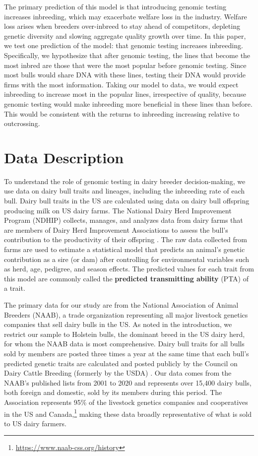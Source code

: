 \documentclass[12pt,letterpaper]{article}
\begin{document}
The primary prediction of this model is that introducing genomic testing increases inbreeding, which may exacerbate welfare loss in the industry. Welfare loss arises when breeders over-inbreed to stay ahead of competitors, depleting genetic diversity and slowing aggregate quality growth over time. In this paper, we test one prediction of the model: that genomic testing increases inbreeding. Specifically, we hypothesize that after genomic testing, the lines that become the most inbred are those that were the most popular before genomic testing. Since most bulls would share DNA with these lines, testing their DNA would provide firms with the most information. Taking our model to data, we would expect inbreeding to increase most in the popular lines, irrespective of quality, because genomic testing would make inbreeding more beneficial in these lines than before.
This would be consistent with the returns to inbreeding increasing relative to outcrossing.

\section{Data Description\label{sec:data_description}}
To understand the role of genomic testing in dairy breeder decision-making, we use data on dairy bull traits and lineages, including the inbreeding rate of each bull. Dairy bull traits in the US are calculated using data on dairy bull offspring producing milk on US dairy farms. The National Dairy Herd Improvement Program (NDHIP) collects, manages, and analyzes data from dairy farms that are members of Dairy Herd Improvement Associations to assess the bull's contribution to the productivity of their offspring \citep{Hutchins_Hueth2023}. The raw data collected from farms are used to estimate a statistical model that predicts an animal's genetic contribution as a sire (or dam) after controlling for environmental variables such as herd, age, pedigree, and season effects. The predicted values for each trait from this model are commonly called the \textbf{predicted transmitting ability} (PTA) of a trait.

The primary data for our study are from the National Association of Animal Breeders (NAAB), a trade organization representing all major livestock genetics companies that sell dairy bulls in the US. As noted in the introduction, we restrict our sample to Holstein bulls, the dominant breed in the US dairy herd, for whom the NAAB data is most comprehensive. Dairy bull traits for all bulls sold by members are posted three times a year at the same time that each bull's predicted genetic traits are calculated and posted publicly by the Council on Dairy Cattle Breeding (formerly by the USDA) \citep{Hutchins_Hueth2023}. Our data comes from the NAAB's published lists from 2001 to 2020 and represents over 15,400 dairy bulls, both foreign and domestic, sold by its members during this period. The Association represents 95\% of the livestock genetics companies and cooperatives in the US and Canada,\footnote{\url{https://www.naab-css.org/history}} making these data broadly representative of what is sold to US dairy farmers.
\end{document}
